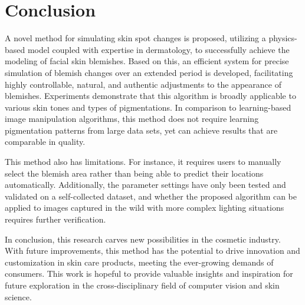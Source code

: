 
\chapter{Conclusion}
\begin{spacing}{1.5}
\setlength{\parskip}{0.3in}

A novel method for simulating skin spot changes is proposed, utilizing a physics-based model coupled with expertise in dermatology, to successfully achieve the modeling of facial skin blemishes. Based on this, an efficient system for precise simulation of blemish changes over an extended period is developed, facilitating highly controllable, natural, and authentic adjustments to the appearance of blemishes. Experiments demonstrate that this algorithm is broadly applicable to various skin tones and types of pigmentations. In comparison to learning-based image manipulation algorithms, this method does not require learning pigmentation patterns from large data sets, yet can achieve results that are comparable in quality.

This method also has limitations. For instance, it requires users to manually select the blemish area rather than being able to predict their locations automatically. Additionally, the parameter settings have only been tested and validated on a self-collected dataset, and whether the proposed algorithm can be applied to images captured in the wild with more complex lighting situations requires further verification.

In conclusion, this research carves new possibilities in the cosmetic industry. With future improvements, this method has the potential to drive innovation and customization in skin care products, meeting the ever-growing demands of consumers. This work is hopeful to provide valuable insights and inspiration for future exploration in the cross-disciplinary field of computer vision and skin science.

\end{spacing}
    
\newpage
